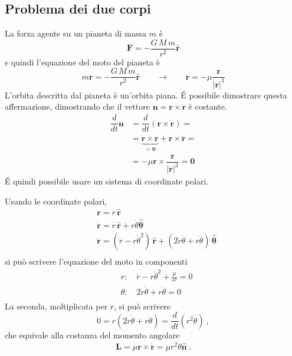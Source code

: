 \subsection{Problema dei due corpi}
La forza agente su un pianeta di massa $m$ è
\begin{equation}
    \mathbf{F} = - \dfrac{G \, M \, m}{r^2} \mathbf{\hat{r}}
\end{equation}
e quindi l'equazione del moto del pianeta è
\begin{equation}
    m \ddot{\mathbf{r}} = - \dfrac{G \, M \, m}{r^2} \mathbf{\hat{r}}
    \qquad \rightarrow \qquad
    \ddot{\mathbf{r}} = - \mu \dfrac{\mathbf{r}}{|\mathbf{r}|^3}
\end{equation}
L'orbita descritta dal pianeta è un'orbita piana. \'E possibile dimostrare questa affermazione, dimostrando che il vettore $\mathbf{n} = \mathbf{r} \times \dot{\mathbf{r}}$ è costante.
\begin{equation}
\begin{aligned}
    \dfrac{d}{dt} \mathbf{n}
    & = \dfrac{d}{dt} \left( \mathbf{r} \times \dot{\mathbf{r}} \right) = \\
    & = \underbrace{\dot{\mathbf{r}} \times \dot{\mathbf{r}}}_{=\mathbf{0}} + \mathbf{r} \times \ddot{\mathbf{r}} = \\
    & = - \mu \mathbf{r} \times \dfrac{\mathbf{r}}{|\mathbf{r}|^3} = \mathbf{0}
\end{aligned}
\end{equation}
\'E quindi possibile usare un sistema di coordinate polari.

\noindent
Usando le coordinate polari,
\begin{equation}
\begin{aligned}
    & \mathbf{r} = r \, \mathbf{\hat{r}} \\
    & \dot{\mathbf{r}} = \dot{r} \, \mathbf{\hat{r}} + r \dot{\theta} \boldsymbol{\hat{\theta}} \\
    & \ddot{\mathbf{r}} = \left( \ddot{r} - r \dot{\theta}^2 \right) \, \mathbf{\hat{r}} + \left( 2 \dot{r} \dot{\theta} + r \ddot{\theta} \right) \, \boldsymbol{\hat{\theta}} \\
\end{aligned}
\end{equation}
si può scrivere l'equazione del moto in componenti
\begin{equation}
\begin{aligned}
    & r:      \quad \ddot{r} - r \dot{\theta}^2 + \frac{\mu}{r^2} = 0 \\
    & \theta: \quad 2 \dot{r} \dot{\theta} + r \ddot{\theta} = 0 \\
\end{aligned}
\end{equation}
La seconda, moltiplicata per $r$, si può scrivere
\begin{equation}
    0 = r \left( 2 \dot{r} \dot{\theta} + r \ddot{\theta}\right) = \dfrac{d}{dt} \left( r^2 \dot{\theta} \right ) \ ,
\end{equation}
che equivale alla costanza del momento angolare
\begin{equation}
    \mathbf{L} = \mu \mathbf{r} \times \dot{\mathbf{r}} = \mu r^2 \dot{\theta} \mathbf{\hat{n}} \ .
\end{equation}
